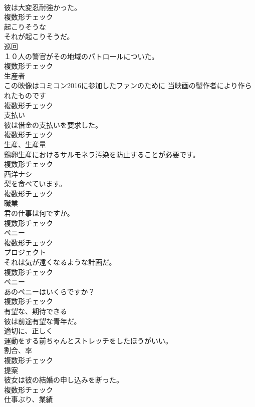 \documentclass[8pt]{extreport}
\begin{document}
\begin{CJK}{UTF8}{min}
\\	彼は大変忍耐強かった。	
\\	複数形チェック
\\	[形容詞]	起こりそうな	
\\	それが起こりそうだ。	
\\	[名詞]	巡回	
\\	１０人の警官がその地域のパトロールについた。	
\\	複数形チェック
\\	[名詞]	生産者	
\\	この映像はコミコン2016に参加したファンのために 当映画の製作者により作られたものです	
\\	複数形チェック
\\	[名詞]	支払い	
\\	彼は借金の支払いを要求した。	
\\	複数形チェック
\\	[名詞]	生産、生産量	
\\	鶏卵生産におけるサルモネラ汚染を防止することが必要です。	
\\	複数形チェック
\\	[名詞]	⻄洋ナシ	
\\	梨を食べています。	
\\	複数形チェック
\\	[名詞]	職業	
\\	君の仕事は何ですか。	
\\	複数形チェック
\\	[名詞]	ペニー	
\\	複数形チェック
\\	[名詞]	プロジェクト	
\\	それは気が遠くなるような計画だ。	
\\	複数形チェック
\\	[名詞]	ペニー	
\\	あのペニーはいくらですか？	
\\	複数形チェック
\\	[形容詞]	有望な、期待できる	
\\	彼は前途有望な青年だ。	
\\	[副詞]	適切に、正しく	
\\	運動をする前ちゃんとストレッチをしたほうがいい。	
\\	[名詞]	割合、率	
\\	複数形チェック
\\	[名詞]	提案	
\\	彼女は彼の結婚の申し込みを断った。	
\\	複数形チェック
\\	[名詞]	仕事ぶり、業績	

\end{CJK}
\end{document}

